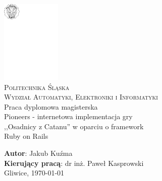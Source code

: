 \documentclass[11pt,twoside]{report}
\begin{document}
\pagestyle{fancy}
\lhead{\nouppercase{\rightmark}}
\rhead{\nouppercase{\leftmark}}
\renewcommand{\chaptermark}[1]{\markboth{\chaptername \ \thechapter. \ #1}{}}
\renewcommand{\sectionmark}[1]{\markright{#1}{}}
\fancyhead{}
\fancyfoot{}
\fancyhead[LO]{\rightmark}
\fancyhead[RE]{\leftmark}
\fancyhead[LE]{\thepage}
\fancyhead[RO]{\thepage}

\begin{titlepage}
  \begin{center}
    \includegraphics[width=80pt]{godlo.pdf}\\[30pt]
    \Large\textsc{Politechnika Śląska}\\[0.5em]
    \textsc{Wydział Automatyki, Elektroniki i Informatyki}\\[100pt]
    \LARGE Praca dyplomowa magisterska\\[50pt]
    Pioneers - internetowa implementacja gry \\[0.5em]
    ,,Osadnicy z Catanu'' w oparciu o
    framework\\[0.5em]
    Ruby on Rails\\[80pt]
  \end{center}
  \Large\textbf{Autor}: Jakub Kuźma\\
  \Large\textbf{Kierujący pracą}: dr inż. Paweł Kasprowski\\
  \vfill
  \normalsize\centering Gliwice, \today
\end{titlepage}

\tableofcontents

\cleardoublepage
\end{document}
